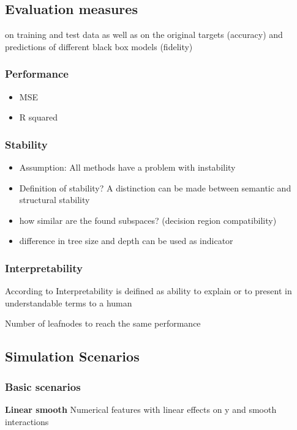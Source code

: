 \subsection{Evaluation measures}
on training and test data as well as on the original targets (accuracy) and predictions of different black box models (fidelity)
\subsubsection{Performance}
\begin{itemize}
    \item MSE
    \item R squared
\end{itemize}

\subsubsection{Stability}

\begin{itemize}
    \item Assumption: All methods have a problem with instability \citep{Fokkema.2020}
    \item Definition of stability? A distinction can be made between semantic and structural stability \citep{Wang.2018}
    \item how similar are the found subspaces? (decision region compatibility) \citep{Wang.2018}

    \item difference in tree size and depth can be used as indicator \citep{Wang.2018}


\end{itemize}






\subsubsection{Interpretability}
According to \citet{DoshiVelez.2017} Interpretability is deifined as ability to explain or to present in understandable
terms to a human

Number of leafnodes to reach the same performance


\subsection{Simulation Scenarios}

\subsubsection{Basic scenarios}
\textbf{Linear smooth}
Numerical features with linear effects on y and smooth interactions


